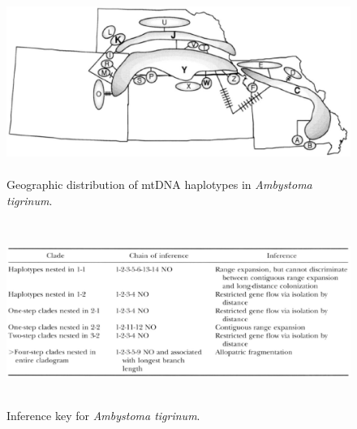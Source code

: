 \begin{figure}
\begin{center}
\includegraphics[height=6cm]{ambystoma.eps}
\end{center}
\caption{Geographic distribution of mtDNA haplotypes in {\it Ambystoma
    tigrinum}.}\label{fig:ambystoma}
\end{figure}

\begin{figure}
\begin{center}
\includegraphics[height=6cm]{ambystoma-inference.eps}
\end{center}
\caption{Inference key for {\it Ambystoma
    tigrinum}.}\label{fig:ambystoma-inference}
\end{figure}


